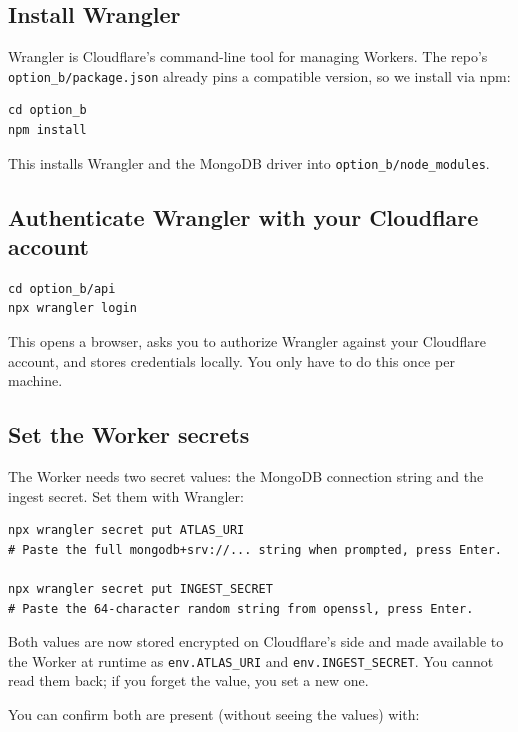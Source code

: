 \documentclass[11pt,a4paper]{article}
\begin{document}
\subsection{Install Wrangler}

Wrangler is Cloudflare's command-line tool for managing Workers. The repo's \texttt{option\_b/package.json} already pins a compatible version, so we install via npm:

\begin{lstlisting}[style=shell]
cd option_b
npm install
\end{lstlisting}

This installs Wrangler and the MongoDB driver into \texttt{option\_b/node\_modules}.

\subsection{Authenticate Wrangler with your Cloudflare account}

\begin{lstlisting}[style=shell]
cd option_b/api
npx wrangler login
\end{lstlisting}

This opens a browser, asks you to authorize Wrangler against your Cloudflare account, and stores credentials locally. You only have to do this once per machine.

\subsection{Set the Worker secrets}

The Worker needs two secret values: the MongoDB connection string and the ingest secret. Set them with Wrangler:

\begin{lstlisting}[style=shell]
npx wrangler secret put ATLAS_URI
# Paste the full mongodb+srv://... string when prompted, press Enter.

npx wrangler secret put INGEST_SECRET
# Paste the 64-character random string from openssl, press Enter.
\end{lstlisting}

Both values are now stored encrypted on Cloudflare's side and made available to the Worker at runtime as \texttt{env.ATLAS\_URI} and \texttt{env.INGEST\_SECRET}. You cannot read them back; if you forget the value, you set a new one.

You can confirm both are present (without seeing the values) with:
\end{document}
